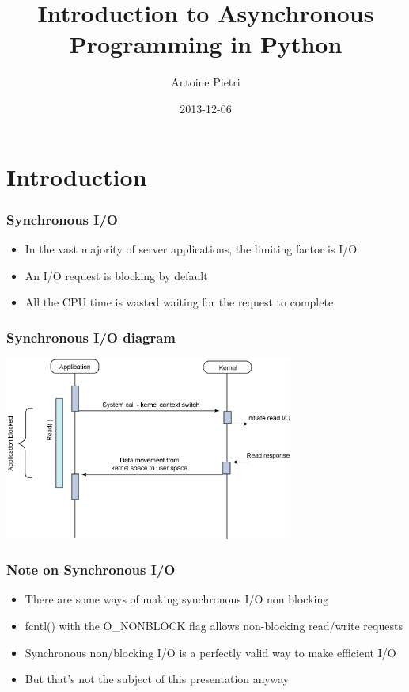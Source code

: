 \documentclass[ignorenonframetext,]{beamer}
\title{Introduction to Asynchronous Programming in Python}
\author{Antoine Pietri}
\date{2013-12-06}
\begin{document}
\frame{\titlepage}

\section{Introduction}

\begin{frame}[fragile]\frametitle{Synchronous I/O}

\begin{itemize}
\itemsep1pt\parskip0pt
\item
  In the vast majority of server applications, the limiting factor is
  I/O
\item
  An I/O request is blocking by default
\item
  All the CPU time is wasted waiting for the request to complete
\end{itemize}

\end{frame}

\begin{frame}\frametitle{Synchronous I/O diagram}

\begin{center}
 \includegraphics[height=6cm]{img/synchronous.png}
\end{center}

\end{frame}

\begin{frame}[fragile]\frametitle{Note on Synchronous I/O}

\begin{itemize}
\itemsep1pt\parskip0pt
\item
  There are some ways of making synchronous I/O non blocking
\item
  fcntl() with the O\_NONBLOCK flag allows non-blocking read/write
  requests
\item
  Synchronous non/blocking I/O is a perfectly valid way to make
  efficient I/O
\item
  But that's not the subject of this presentation anyway
\end{itemize}

\end{frame}
\end{document}
